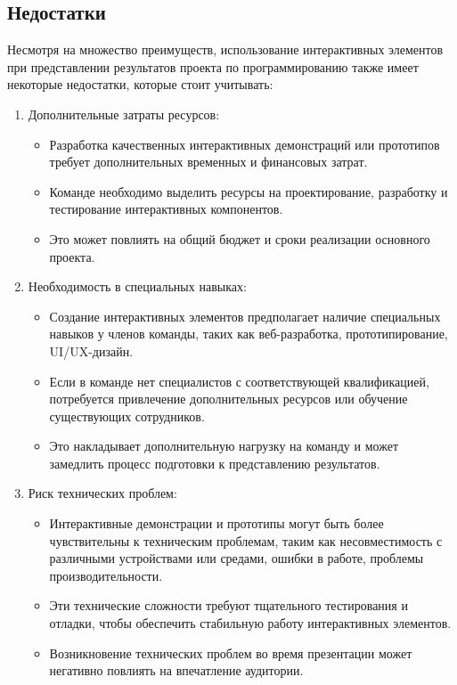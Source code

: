 \subsection*{Недостатки}
Несмотря на множество преимуществ, использование интерактивных элементов при представлении результатов проекта по программированию также имеет некоторые недостатки, которые стоит учитывать:
\begin{enumerate}
    \item Дополнительные затраты ресурсов:
        \begin{itemize}
            \item Разработка качественных интерактивных демонстраций или прототипов требует дополнительных временных и финансовых затрат.
            \item Команде необходимо выделить ресурсы на проектирование, разработку и тестирование интерактивных компонентов.
            \item Это может повлиять на общий бюджет и сроки реализации основного проекта.
        \end{itemize}
    \item Необходимость в специальных навыках:
        \begin{itemize}
            \item Создание интерактивных элементов предполагает наличие специальных навыков у членов команды, таких как веб-разработка, прототипирование, UI/UX-дизайн.
            \item Если в команде нет специалистов с соответствующей квалификацией, потребуется привлечение дополнительных ресурсов или обучение существующих сотрудников.
            \item Это накладывает дополнительную нагрузку на команду и может замедлить процесс подготовки к представлению результатов.
        \end{itemize}
    \item Риск технических проблем:
        \begin{itemize}
            \item Интерактивные демонстрации и прототипы могут быть более чувствительны к техническим проблемам, таким как несовместимость с различными устройствами или средами, ошибки в работе, проблемы производительности.
            \item Эти технические сложности требуют тщательного тестирования и отладки, чтобы обеспечить стабильную работу интерактивных элементов.
            \item Возникновение технических проблем во время презентации может негативно повлиять на впечатление аудитории.

\end{itemize}
\end{enumerate}
